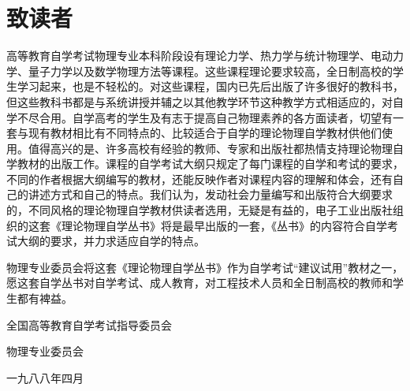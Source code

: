 \chapter{致读者}\label{chp:0}

高等教育自学考试物理专业本科阶段设有理论力学、热力学与统计物理学、电动力学、量子力学以及数学物理方法等课程。这些课程理论要求较高，全日制高校的学生学习起来，也是不轻松的。对这些课程，国内已先后出版了许多很好的教科书，但这些教科书都是与系统讲授并辅之以其他教学环节这种教学方式相适应的，对自学不尽合用。自学高考的学生及有志于提高自己物理素养的各方面读者，切望有一套与现有教材相比有不同特点的、比较适合于自学的理论物理自学教材供他们使用。值得高兴的是、许多高校有经验的教师、专家和出版社都热情支持理论物理自学教材的出版工作。课程的自学考试大纲只规定了每门课程的自学和考试的要求，不同的作者根据大纲编写的教材，还能反映作者对课程内容的理解和体会，还有自己的讲述方式和自己的特点。我们认为，发动社会力量编写和出版符合大纲要求的，不同风格的理论物理自学教材供读者选用，无疑是有益的，电子工业出版社组织的这套《理论物理自学丛书》将是最早出版的一套，《丛书》的内容符合自学考试大纲的要求，并力求适应自学的特点。

物理专业委员会将这套《理论物理自学丛书》作为自学考试“建议试用”教材之一，愿这套自学丛书对自学考试、成人教育，对工程技术人员和全日制高校的教师和学生都有裨益。



\mbox{} 

\leftskip=45mm 全国高等教育自学考试指导委员会 

\leftskip=70mm 物理专业委员会

\pskip
\leftskip=70mm 一九八八年四月

\leftskip=0mm
\clearpage